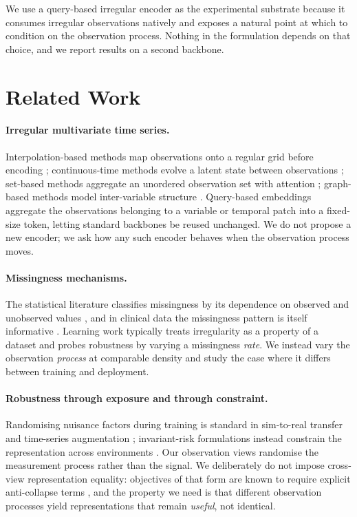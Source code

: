 \documentclass[sigconf,nonacm]{acmart}
\begin{document}
We use a query-based irregular encoder \cite{lim2026quite} as the experimental substrate because it consumes
irregular observations natively and exposes a natural point at which to condition on the observation process.
Nothing in the formulation depends on that choice, and we report results on a second backbone.

\section{Related Work}
\paragraph{Irregular multivariate time series.}
Interpolation-based methods map observations onto a regular grid before encoding \cite{shukla2019ipn};
continuous-time methods evolve a latent state between observations
\cite{rubanova2019latentode,debrouwer2019gruodebayes,kidger2020ncde}; set-based methods aggregate an unordered
observation set with attention \cite{horn2020seft,shukla2021mtand}; graph-based methods model inter-variable
structure \cite{zhang2022raindrop,zhang2024tpatchgnn}. Query-based embeddings \cite{lim2026quite} aggregate the
observations belonging to a variable or temporal patch into a fixed-size token, letting standard backbones
\cite{liu2024itransformer,nie2023patchtst} be reused unchanged. We do not propose a new encoder; we ask how any
such encoder behaves when the observation process moves.

\paragraph{Missingness mechanisms.}
The statistical literature classifies missingness by its dependence on observed and unobserved values
\cite{rubin1976missing}, and in clinical data the missingness pattern is itself informative
\cite{lipton2016informative,che2018grud}. Learning work typically treats irregularity as a property of a dataset
and probes robustness by varying a missingness \emph{rate}. We instead vary the observation \emph{process} at
comparable density and study the case where it differs between training and deployment.

\paragraph{Robustness through exposure and through constraint.}
Randomising nuisance factors during training is standard in sim-to-real transfer
\cite{tobin2017domainrand} and time-series augmentation \cite{wen2021augmentation}; invariant-risk formulations
instead constrain the representation across environments \cite{arjovsky2019irm}. Our observation views randomise
the measurement process rather than the signal. We deliberately do not impose cross-view representation
equality: objectives of that form are known to require explicit anti-collapse terms
\cite{chen2020simclr,grill2020byol,bardes2022vicreg}, and the property we need is that different observation
processes yield representations that remain \emph{useful}, not identical.
\end{document}
